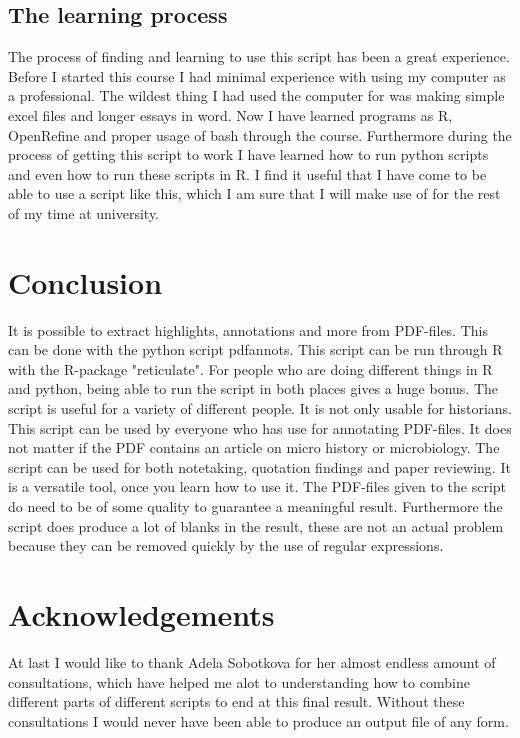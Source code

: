 \documentclass{article}
\begin{document}
\subsection{The learning process}
The process of finding and learning to use this script has been a great experience. Before I started this course I had minimal experience with using my computer as a professional. The wildest thing I had used the computer for was making simple excel files and longer essays in word. Now I have learned programs as R, OpenRefine and proper usage of bash through the course. Furthermore during the process of getting this script to work I have learned how to run python scripts and even how to run these scripts in R. I find it useful that I have come to be able to use a script like this, which I am sure that I will make use of for the rest of my time at university.

\section{Conclusion}
It is possible to extract highlights, annotations and more from PDF-files. This can be done with the python script pdfannots. This script can be run through R with the R-package "reticulate". For people who are doing different things in R and python, being able to run the script in both places gives a huge bonus. The script is useful for a variety of different people. It is not only usable for historians. This script can be used by everyone who has use for annotating PDF-files. It does not matter if the PDF contains an article on micro history or microbiology. The script can be used for both notetaking, quotation findings and paper reviewing. It is a versatile tool, once you learn how to use it. The PDF-files given to the script do need to be of some quality to guarantee a meaningful result. Furthermore the script does produce a lot of blanks in the result, these are not an actual problem because they can be removed quickly by the use of regular expressions. 

\section{Acknowledgements}
At last I would like to thank Adela Sobotkova for her almost endless amount of consultations, which have helped me alot to understanding how to combine different parts of different scripts to end at this final result. Without these consultations I would never have been able to  produce an output file of any form. 
\newpage
\end{document}
